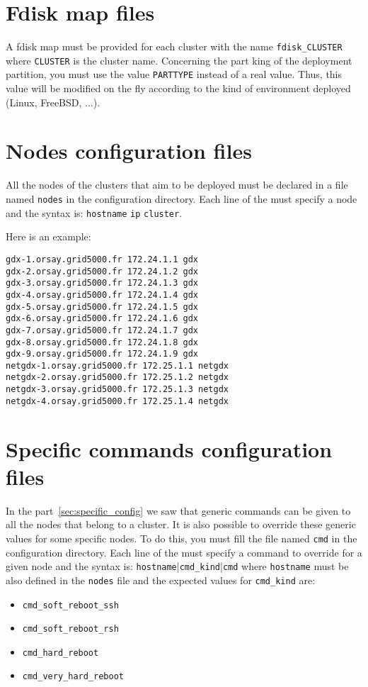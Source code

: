 \documentclass[a4wide,10pt,oneside]{book}
\begin{document}
\section{Fdisk map files}
A fdisk map must be provided for each cluster with the name \texttt{fdisk\_CLUSTER} where \texttt{CLUSTER} is the cluster name. Concerning the part king of the deployment partition, you must use the value \texttt{PARTTYPE} instead of a real value. Thus, this value will be modified on the fly according to the kind of environment deployed (Linux, FreeBSD, ...).

\section{Nodes configuration files}
All the nodes of the clusters that aim to be deployed must be declared in a file named \texttt{nodes} in the configuration directory. Each line of the must specify a node and the syntax is: \texttt{hostname} \texttt{ip} \texttt{cluster}.

Here is an example:
\begin{small}
\begin{verbatim}
gdx-1.orsay.grid5000.fr 172.24.1.1 gdx
gdx-2.orsay.grid5000.fr 172.24.1.2 gdx
gdx-3.orsay.grid5000.fr 172.24.1.3 gdx
gdx-4.orsay.grid5000.fr 172.24.1.4 gdx
gdx-5.orsay.grid5000.fr 172.24.1.5 gdx
gdx-6.orsay.grid5000.fr 172.24.1.6 gdx
gdx-7.orsay.grid5000.fr 172.24.1.7 gdx
gdx-8.orsay.grid5000.fr 172.24.1.8 gdx
gdx-9.orsay.grid5000.fr 172.24.1.9 gdx
netgdx-1.orsay.grid5000.fr 172.25.1.1 netgdx
netgdx-2.orsay.grid5000.fr 172.25.1.2 netgdx
netgdx-3.orsay.grid5000.fr 172.25.1.3 netgdx
netgdx-4.orsay.grid5000.fr 172.25.1.4 netgdx
\end{verbatim}
\end{small}

\section{Specific commands configuration files}
In the part~\ref{sec:specific_config} we saw that generic commands can be given to all the nodes that belong to a cluster. It is also possible to override these generic values for some specific nodes. To do this, you must fill the file named \texttt{cmd} in the configuration directory. Each line of the must specify a command to override for a given node and the syntax is: \texttt{hostname}|\texttt{cmd\_kind}|\texttt{cmd} where \texttt{hostname} must be also defined in the \texttt{nodes} file and the expected values for \texttt{cmd\_kind} are:
\begin{itemize}
\item \texttt{cmd\_soft\_reboot\_ssh}
\item \texttt{cmd\_soft\_reboot\_rsh}
\item \texttt{cmd\_hard\_reboot}
\item \texttt{cmd\_very\_hard\_reboot}
\end{itemize}
\end{document}
